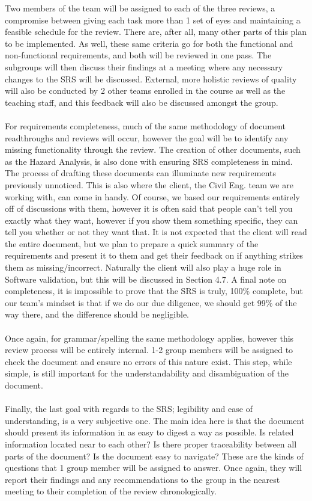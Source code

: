 \documentclass[12pt, titlepage]{article}
\begin{document}
Two members of the team will be assigned to each of the three reviews, a compromise between giving each task more than 1 set of eyes and maintaining a feasible schedule
for the review. There are, after all, many other parts of this plan to be implemented.  As well, these same criteria go for both the functional and non-functional requirements,
and both will be reviewed in one pass. The subgroups will then discuss their findings at a meeting where any necessary changes to the SRS will be discussed. External, 
more holistic reviews of quality will also be conducted by 2 other teams enrolled in the course as well as the teaching staff, and this feedback will also be discussed 
amongst the group.\\\\ For requirements completeness, much of the same methodology of document readthroughs and reviews will occur, however the goal will be to identify any 
missing functionality through the review. The creation of other documents, such as the Hazard Analysis, is also done with ensuring SRS completeness in mind. The process of 
drafting these documents can illuminate new requirements previously unnoticed. This is also where the client, the Civil Eng. team we are working with, can come in handy.
Of course, we based our requirements entirely off of discussions with them, however it is often said that people can’t tell you exactly what they want, however if you show
them something specific, they can tell you whether or not they want that. It is not expected that the client will read the entire document, but we plan to prepare a quick 
summary of the requirements and present it to them and get their feedback on if anything strikes them as missing/incorrect. Naturally the client will also play a huge role
in Software validation, but this will be discussed in Section 4.7. A final note on completeness, it is impossible to prove that the SRS is truly, 100\% complete, but our team’s
mindset is that if we do our due diligence, we should get 99\% of the way there, and the difference should be negligible.\\\\
Once again, for grammar/spelling the same methodology applies, however this review process will be entirely internal. 1-2 group members will be assigned to 
check the document and ensure no errors of this nature exist. This step, while simple, is still important for the understandability and disambiguation of the document.\\\\
Finally, the last goal with regards to the SRS; legibility and ease of understanding, is a very subjective one. The main idea here is that the document should present 
its information in as easy to digest a way as possible. Is related information located near to each other? Is there proper traceability between all parts of the document? 
Is the document easy to navigate? These are the kinds of questions that 1 group member will be assigned to answer. Once again, they will report their findings and any 
recommendations to the group in the nearest meeting to their completion of the review chronologically.
\end{document}
